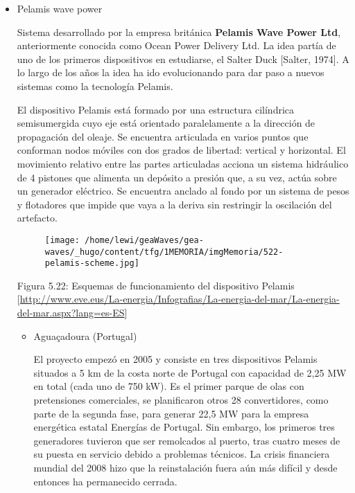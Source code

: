 \begin{itemize}
\item
  Pelamis wave power

  Sistema desarrollado por la empresa británica \textbf{Pelamis Wave
  Power Ltd}, anteriormente conocida como Ocean Power Delivery Ltd. La
  idea partía de uno de los primeros dispositivos en estudiarse, el
  Salter Duck {[}Salter, 1974{]}. A lo largo de los años la idea ha ido
  evolucionando para dar paso a nuevos sistemas como la tecnología
  Pelamis.

  El dispositivo Pelamis está formado por una estructura cilíndrica
  semisumergida cuyo eje está orientado paralelamente a la dirección de
  propagación del oleaje. Se encuentra articulada en varios puntos que
  conforman nodos móviles con dos grados de libertad: vertical y
  horizontal. El movimiento relativo entre las partes articuladas
  acciona un sistema hidráulico de 4 pistones que alimenta un depósito a
  presión que, a su vez, actúa sobre un generador eléctrico. Se
  encuentra anclado al fondo por un sistema de pesos y flotadores que
  impide que vaya a la deriva sin restringir la oscilación del
  artefacto.

  \begin{figure}
  \centering
  \texttt{[image: /home/lewi/geaWaves/gea-waves/\_hugo/content/tfg/1MEMORIA/imgMemoria/522-pelamis-scheme.jpg]}
  \caption{}
  \end{figure}

  Figura 5.22: Esquemas de funcionamiento del dispositivo Pelamis
  {[}\url{http://www.eve.eus/La-energia/Infografias/La-energia-del-mar/La-energia-del-mar.aspx?lang=es-ES}{]}

  \begin{itemize}
  \item
    Aguaçadoura (Portugal)

    El proyecto empezó en 2005 y consiste en tres dispositivos Pelamis
    situados a 5 km de la costa norte de Portugal con capacidad de 2,25
    MW en total (cada uno de 750 kW). Es el primer parque de olas con
    pretensiones comerciales, se planificaron otros 28 convertidores,
    como parte de la segunda fase, para generar 22,5 MW para la empresa
    energética estatal Energías de Portugal. Sin embargo, los primeros
    tres generadores tuvieron que ser remolcados al puerto, tras cuatro
    meses de su puesta en servicio debido a problemas técnicos. La
    crisis financiera mundial del 2008 hizo que la reinstalación fuera
    aún más difícil y desde entonces ha permanecido cerrada.


\end{itemize}
\end{itemize}
